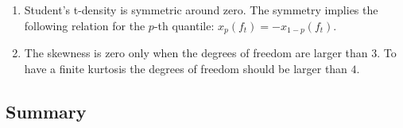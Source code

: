 \begin{enumerate}
    \item Student’s t-density is symmetric around zero.
    The symmetry implies the following relation for the $p$-th quantile: $x _p ( f _t ) = -x_{1- p} ( f _t )$.
    \hfill \cite{statistics/book/Statistics-for-Data-Scientists/Maurits-Kaptein}

    \item The skewness is zero only when the degrees of freedom are larger than $3$.
    To have a finite kurtosis the degrees of freedom should be larger than $4$.
    \hfill \cite{statistics/book/Statistics-for-Data-Scientists/Maurits-Kaptein}
\end{enumerate}




\subsection{Summary}

